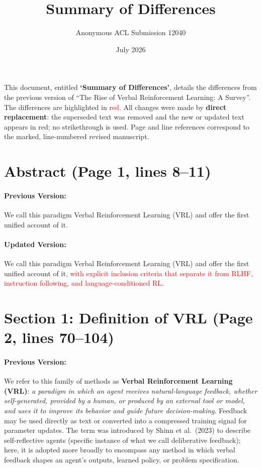 \documentclass[11pt]{article}
\title{Summary of Differences}
\author{Anonymous ACL Submission 12040}
\date{July 2026}
\newcommand{\red}[1]{\textcolor{red}{#1}}
\begin{document}
\maketitle

This document, entitled \textbf{`Summary of Differences'}, details the differences from the previous version of ``The Rise of Verbal Reinforcement Learning: A Survey''. The differences are highlighted in \red{red}. All changes were made by \textbf{direct replacement}: the superseded text was removed and the new or updated text appears in red; no strikethrough is used. Page and line references correspond to the marked, line-numbered revised manuscript.

\section{Abstract (Page 1, lines 8--11)}

\paragraph{Previous Version:} We call this paradigm Verbal Reinforcement Learning (VRL) and offer the first unified account of it.

\paragraph{Updated Version:} We call this paradigm Verbal Reinforcement Learning (VRL) and offer the first unified account of it\red{, with explicit inclusion criteria that separate it from RLHF, instruction following, and language-conditioned RL}.

\section{Section 1: Definition of VRL (Page 2, lines 70--104)}

\paragraph{Previous Version:} We refer to this family of methods as \textbf{Verbal Reinforcement Learning (VRL)}: \textit{a paradigm in which an agent receives natural-language feedback, whether self-generated, provided by a human, or produced by an external tool or model, and uses it to improve its behavior and guide future decision-making}. Feedback may be used directly as text or converted into a compressed training signal for parameter updates. The term was introduced by Shinn et al.\ (2023) to describe self-reflective agents (specific instance of what we call deliberative feedback); here, it is adopted more broadly to encompass any method in which verbal feedback shapes an agent's outputs, learned policy, or problem specification.
\end{document}
